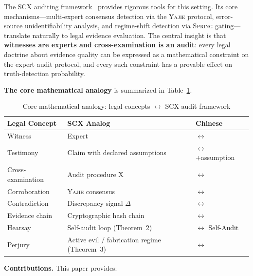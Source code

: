 \documentclass[11pt,a4paper]{article}
\theoremstyle{definition}
\newcommand{\Yajie}{\textsc{Yajie}}
\newcommand{\Spring}{\textsc{Spring}}
\newcommand{\SCX}{\textsc{SCX}}
\newcommand{\discrepancy}{\Delta}              %
\newcommand{\crossexam}{\mathrm{X}}             %
\begin{document}
The \SCX{} auditing framework~\cite{SCX2025} provides rigorous tools for this setting. Its core mechanisms---multi-expert consensus detection via the \Yajie{} protocol, error-source unidentifiability analysis, and regime-shift detection via \Spring{} gating---translate naturally to legal evidence evaluation. The central insight is that \textbf{witnesses are experts and cross-examination is an audit}: every legal doctrine about evidence quality can be expressed as a mathematical constraint on the expert audit protocol, and every such constraint has a provable effect on truth-detection probability.

\medskip
\noindent\textbf{The core mathematical analogy} is summarized in Table~\ref{tab:analogy}.

\begin{table}[ht]
\centering
\caption{Core mathematical analogy: legal concepts $\leftrightarrow$ SCX audit framework}
\label{tab:analogy}
\begin{tabular}{@{}lll@{}}
\toprule
\textbf{Legal Concept} & \textbf{SCX Analog} & \textbf{Chinese} \\
\midrule
Witness & Expert &  $\leftrightarrow$  \\
Testimony & Claim with declared assumptions &  $\leftrightarrow$ +assumption \\
Cross-examination & Audit procedure $\crossexam$ &  $\leftrightarrow$  \\
Corroboration & \Yajie{} consensus &  $\leftrightarrow$  \\
Contradiction & Discrepancy signal $\discrepancy$ &  $\leftrightarrow$  \\
Evidence chain & Cryptographic hash chain &  $\leftrightarrow$  \\
Hearsay & Self-audit loop (Theorem~2) &  $\leftrightarrow$ Self-Audit \\
Perjury & Active evil / fabrication regime (Theorem~3) &  $\leftrightarrow$  \\
\bottomrule
\end{tabular}
\end{table}

\medskip
\noindent\textbf{Contributions.} This paper provides:
\end{document}
